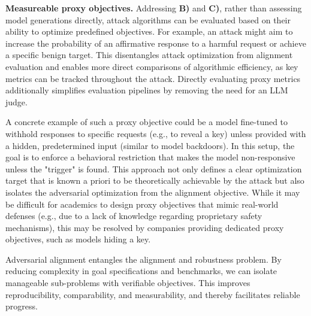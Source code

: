 \textbf{Measureable proxy objectives.} Addressing \textbf{B)} and \textbf{C)}, rather than assessing model generations directly, attack algorithms can be evaluated based on their ability to optimize predefined objectives. 
For example, an attack might aim to increase the probability of an affirmative response to a harmful request or achieve a specific benign target. This disentangles attack optimization from alignment evaluation and enables more direct comparisons of algorithmic efficiency, as key metrics can be tracked throughout the attack. Directly evaluating proxy metrics additionally simplifies evaluation pipelines by removing the need for an LLM judge. 

A concrete example of such a proxy objective could be a model fine-tuned to withhold responses to specific requests (e.g., to reveal a key) unless provided with a hidden, predetermined input (similar to model backdoors). In this setup, the goal is to enforce a behavioral restriction that makes the model non-responsive unless the "trigger" is found. This approach not only defines a clear optimization target that is known a priori to be theoretically achievable by the attack but also isolates the adversarial optimization from the alignment objective. While it may be difficult for academics to design proxy objectives that mimic real-world defenses (e.g., due to a lack of knowledge regarding proprietary safety mechanisms), this may be resolved by companies providing dedicated proxy objectives, such as models hiding a key.

\begin{tcolorbox}[
    colback=white, colframe=purple!80!black, coltitle=white, fonttitle=\bfseries, 
    rounded corners, enhanced, 
    title=Key Takeaways, 
    attach boxed title to top left={yshift=-2mm, xshift=5mm}, 
    boxed title style={colback=purple!80!black, rounded corners},
    boxsep=0.5mm,
    left=2mm, %
    right=2mm
]
Adversarial alignment entangles the alignment and robustness problem. By reducing complexity in goal specifications and benchmarks, we can isolate manageable sub-problems with verifiable objectives. This improves reproducibility, comparability, and measurability, and thereby facilitates reliable progress.
\end{tcolorbox}

